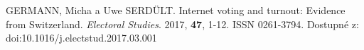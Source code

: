\begin{thebibliography}{1}

GERMANN, Micha a Uwe SERDÜLT. Internet voting and turnout: Evidence from Switzerland. \textit{Electoral Studies}. 2017, \textbf{47}, 1-12. ISSN 0261-3794. Dostupné z: doi:10.1016/j.electstud.2017.03.001

\end{thebibliography}